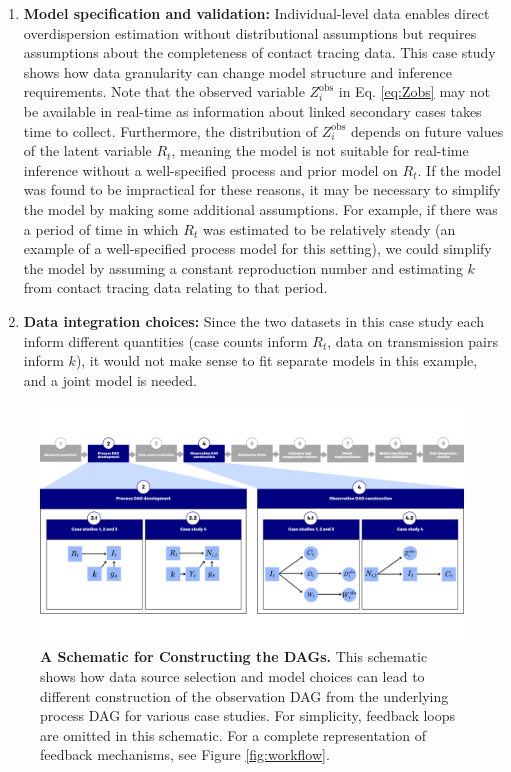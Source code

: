 \documentclass{article}
\begin{document}
\begin{enumerate}
    \item \textbf{Model specification and validation:} Individual-level data enables direct overdispersion estimation without distributional assumptions but requires assumptions about the completeness of contact tracing data. This case study shows how data granularity can change model structure and inference requirements. Note that the observed variable $Z^\mathrm{obs}_i$ in Eq. \eqref{eq:Zobs} may not be available in real-time as information about linked secondary cases takes time to collect. Furthermore, the distribution of $Z^\mathrm{obs}_i$ depends on future values of the latent variable $R_t$, meaning the model is not suitable for real-time inference without a well-specified process and prior model on $R_t$. If the model was found to be impractical for these reasons, it may be necessary to simplify the model by making some additional assumptions. For example, if there was a period of time in which $R_t$ was estimated to be relatively steady (an example of a well-specified process model for this setting), we could simplify the model by assuming a constant reproduction number and estimating $k$ from contact tracing data relating to that period. 

    \item \textbf{Data integration choices:} Since the two datasets in this case study each inform different quantities (case counts inform $R_t$, data on transmission pairs inform $k$), it would not make sense to fit separate models in this example, and a joint model is needed. 
\end{enumerate}




\begin{figure}[htbp]
    \centering
    \includegraphics[width=\textwidth]{figures/Abbott et al figure 7.png}
    \caption{\textbf{A Schematic for Constructing the DAGs.} This schematic shows how data source selection and model choices can lead to different construction of the observation \ac{DAG} from the underlying process DAG for various case studies. For simplicity, feedback loops are omitted in this schematic. For a complete representation of feedback mechanisms, see Figure \ref{fig:workflow}.}
    \label{fig:case_study_diagram}
\end{figure}
\end{document}
